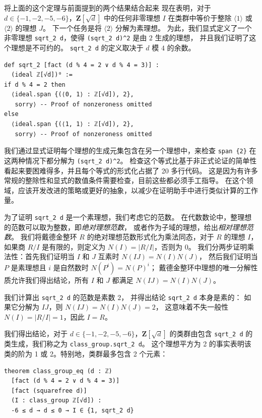 \documentclass[sigplan,10pt,nonacm,
screen]{acmart} \settopmatter{printfolios=true,printccs=false,printacmref=false}
\newcommand{\ZZ}{\mathbf{Z}}
\begin{document}
将上面的这个定理与前面提到的两个结果结合起来
现在表明，对于 $d\in \{-1,-2,-5,-6\}$，$\ZZ[\sqrt{d}]$ 中的任何非零理想 $I$ 在类群中等价于整除 $\langle 1 \rangle$ 或 $\langle 2 \rangle$ 的理想 $J$。
下一个任务是将 $\langle 2 \rangle$ 分解为素理想。
为此，我们显式定义了一个非零理想 \lstinline{sqrt_2 d}，使得 \lstinline!(sqrt_2 d)^2! 是由 $2$ 生成的理想，
并且我们证明了这个理想是不可约的。
\lstinline{sqrt_2 d} 的定义取决于 $d$ 模 $4$ 的余数。
\begin{lstlisting}
def sqrt_2 [fact (d % 4 = 2 ∨ d % 4 = 3)] :
  (ideal ℤ[√d])⁰ :=
if d % 4 = 2 then
  ⟨ideal.span {(⟨0, 1⟩ : ℤ[√d]), 2},
   sorry⟩ -- Proof of nonzeroness omitted
else
  ⟨ideal.span {(⟨1, 1⟩ : ℤ[√d]), 2},
   sorry⟩ -- Proof of nonzeroness omitted
\end{lstlisting}
我们通过显式证明每个理想的生成元集包含在另一个理想中，来检查 \lstinline!span {2}! 在这两种情况下都分解为 \lstinline{(sqrt_2 d)^2}。
检查这个等式比基于非正式论证的简单性看起来要困难得多，并且每个等式的形式化占据了 20 多行代码。
这是因为有许多常规的整除性和显式的数值条件需要检查，目前这些都必须手工指导。
在这个领域，应该开发改进的策略或更好的抽象，以减少在证明助手中进行类似计算的工作量。

为了证明 \lstinline{sqrt_2 d} 是一个素理想，我们考虑它的范数。
在代数数论中，整理想的范数可以取为整数，即\emph{绝对理想范数}，
或者作为子域的理想，给出\emph{相对理想范数}。
我们将戴德金整环 $R$ 的绝对理想范数形式化为乘法同态，对于 $R$ 的理想 $I$，如果商 $R/I$ 是有限的，则定义为 $N(I) = \left|R / I\right|$，否则为 $0$。
我们分两步证明乘法性：首先我们证明当 $I$ 和 $J$ 互素时 $N(IJ) = N(I) N(J)$，
然后我们证明当 $P$ 是素理想且 $i$ 是自然数时 $N(P^i) = N(P)^i$；
戴德金整环中理想的唯一分解性质允许我们得出结论，所有 $I$ 和 $J$ 都满足 $N(IJ) = N(I) N(J)$。

我们计算出 \lstinline{sqrt_2 d} 的范数是素数 $2$，
并得出结论 \lstinline{sqrt_2 d} 本身是素的：
如果它分解为 $IJ$，则 $N(IJ) = N(I) N(J) = 2$，
这意味着不失一般性 $N(I) = |R/I| = 1$，因此 $I = R$。

我们得出结论，对于 $d\in \{-1,-2,-5,-6\}$，$\ZZ[\sqrt{d}]$ 的类群由包含 \lstinline{sqrt_2 d} 的类生成，我们称之为 \lstinline{class_group.sqrt_2 d}。
这个理想平方为 2 的事实表明该类的阶为 1 或 2。特别地，类群最多包含 2 个元素：
\begin{lstlisting}
theorem class_group_eq (d : ℤ)
  [fact (d % 4 = 2 ∨ d % 4 = 3)]
  [fact (squarefree d)]
  (I : class_group ℤ[√d]) :
  -6 ≤ d → d ≤ 0 → I ∈ {1, sqrt_2 d}
\end{lstlisting}
\end{document}
